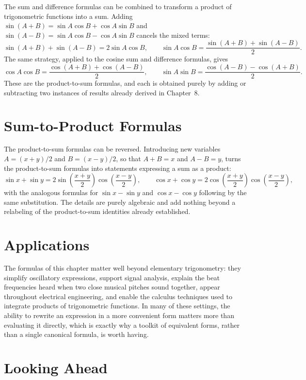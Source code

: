 The sum and difference formulas can be combined to transform a product of
trigonometric functions into a sum. Adding $\sin(A+B) = \sin A\cos B +
\cos A\sin B$ and $\sin(A-B) = \sin A\cos B - \cos A\sin B$ cancels the
mixed terms:
\[
\sin(A+B) + \sin(A-B) = 2\sin A\cos B, \qquad
\boxed{\sin A\cos B = \frac{\sin(A+B)+\sin(A-B)}{2}}.
\]
The same strategy, applied to the cosine sum and difference formulas,
gives
\[
\boxed{\cos A\cos B = \frac{\cos(A+B)+\cos(A-B)}{2}}, \qquad
\boxed{\sin A\sin B = \frac{\cos(A-B)-\cos(A+B)}{2}}.
\]
These are the product-to-sum formulas, and each is obtained purely by
adding or subtracting two instances of results already derived in
Chapter~8.

\section{Sum-to-Product Formulas}

The product-to-sum formulas can be reversed. Introducing new variables
$A = (x+y)/2$ and $B = (x-y)/2$, so that $A+B = x$ and $A-B = y$, turns the
product-to-sum formulas into statements expressing a sum as a product:
\[
\boxed{\sin x + \sin y = 2\sin\left(\frac{x+y}{2}\right)\cos\left(\frac{x-y}{2}\right)}, \qquad
\boxed{\cos x + \cos y = 2\cos\left(\frac{x+y}{2}\right)\cos\left(\frac{x-y}{2}\right)},
\]
with the analogous formulas for $\sin x - \sin y$ and $\cos x - \cos y$
following by the same substitution. The details are purely algebraic and
add nothing beyond a relabeling of the product-to-sum identities already
established.

\section{Applications}

The formulas of this chapter matter well beyond elementary trigonometry:
they simplify oscillatory expressions, support signal analysis, explain
the beat frequencies heard when two close musical pitches sound together,
appear throughout electrical engineering, and enable the calculus
techniques used to integrate products of trigonometric functions. In many
of these settings, the ability to rewrite an expression in a more
convenient form matters more than evaluating it directly, which is exactly
why a toolkit of equivalent forms, rather than a single canonical formula,
is worth having.

\section{Looking Ahead}

